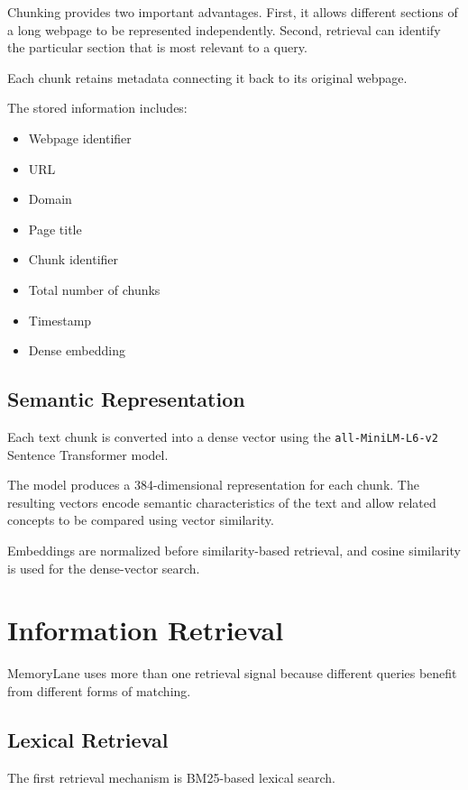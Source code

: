 \documentclass{tietreport}
\begin{document}
Chunking provides two important advantages. First, it allows
different sections of a long webpage to be represented
independently. Second, retrieval can identify the particular
section that is most relevant to a query.

Each chunk retains metadata connecting it back to its original
webpage.

The stored information includes:

\begin{itemize}
    \item Webpage identifier
    \item URL
    \item Domain
    \item Page title
    \item Chunk identifier
    \item Total number of chunks
    \item Timestamp
    \item Dense embedding
\end{itemize}

\subsection{Semantic Representation}

Each text chunk is converted into a dense vector using the
\texttt{all-MiniLM-L6-v2} Sentence Transformer model.

The model produces a 384-dimensional representation for each
chunk. The resulting vectors encode semantic characteristics
of the text and allow related concepts to be compared using
vector similarity.

Embeddings are normalized before similarity-based retrieval,
and cosine similarity is used for the dense-vector search.

\section{Information Retrieval}

MemoryLane uses more than one retrieval signal because
different queries benefit from different forms of matching.

\subsection{Lexical Retrieval}

The first retrieval mechanism is BM25-based lexical search.
\end{document}
